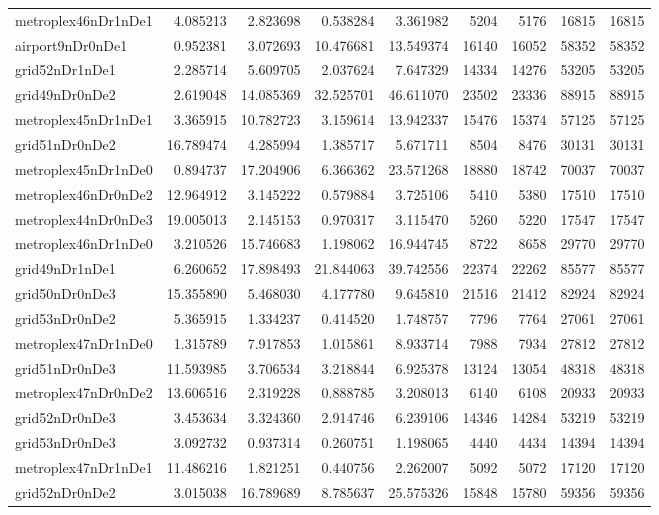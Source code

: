 \begin{longtable}{|l|r|r|r|r|r|r|r|r|}
metroplex46nDr1nDe1 & 4.085213 & 2.823698 & 0.538284 & 3.361982 & 5204 & 5176 & 16815 & 16815 \\
airport9nDr0nDe1 & 0.952381 & 3.072693 & 10.476681 & 13.549374 & 16140 & 16052 & 58352 & 58352 \\
grid52nDr1nDe1 & 2.285714 & 5.609705 & 2.037624 & 7.647329 & 14334 & 14276 & 53205 & 53205 \\
grid49nDr0nDe2 & 2.619048 & 14.085369 & 32.525701 & 46.611070 & 23502 & 23336 & 88915 & 88915 \\
metroplex45nDr1nDe1 & 3.365915 & 10.782723 & 3.159614 & 13.942337 & 15476 & 15374 & 57125 & 57125 \\
grid51nDr0nDe2 & 16.789474 & 4.285994 & 1.385717 & 5.671711 & 8504 & 8476 & 30131 & 30131 \\
metroplex45nDr1nDe0 & 0.894737 & 17.204906 & 6.366362 & 23.571268 & 18880 & 18742 & 70037 & 70037 \\
metroplex46nDr0nDe2 & 12.964912 & 3.145222 & 0.579884 & 3.725106 & 5410 & 5380 & 17510 & 17510 \\
metroplex44nDr0nDe3 & 19.005013 & 2.145153 & 0.970317 & 3.115470 & 5260 & 5220 & 17547 & 17547 \\
metroplex46nDr1nDe0 & 3.210526 & 15.746683 & 1.198062 & 16.944745 & 8722 & 8658 & 29770 & 29770 \\
grid49nDr1nDe1 & 6.260652 & 17.898493 & 21.844063 & 39.742556 & 22374 & 22262 & 85577 & 85577 \\
grid50nDr0nDe3 & 15.355890 & 5.468030 & 4.177780 & 9.645810 & 21516 & 21412 & 82924 & 82924 \\
grid53nDr0nDe2 & 5.365915 & 1.334237 & 0.414520 & 1.748757 & 7796 & 7764 & 27061 & 27061 \\
metroplex47nDr1nDe0 & 1.315789 & 7.917853 & 1.015861 & 8.933714 & 7988 & 7934 & 27812 & 27812 \\
grid51nDr0nDe3 & 11.593985 & 3.706534 & 3.218844 & 6.925378 & 13124 & 13054 & 48318 & 48318 \\
metroplex47nDr0nDe2 & 13.606516 & 2.319228 & 0.888785 & 3.208013 & 6140 & 6108 & 20933 & 20933 \\
grid52nDr0nDe3 & 3.453634 & 3.324360 & 2.914746 & 6.239106 & 14346 & 14284 & 53219 & 53219 \\
grid53nDr0nDe3 & 3.092732 & 0.937314 & 0.260751 & 1.198065 & 4440 & 4434 & 14394 & 14394 \\
metroplex47nDr1nDe1 & 11.486216 & 1.821251 & 0.440756 & 2.262007 & 5092 & 5072 & 17120 & 17120 \\
grid52nDr0nDe2 & 3.015038 & 16.789689 & 8.785637 & 25.575326 & 15848 & 15780 & 59356 & 59356 \\

\end{longtable}
